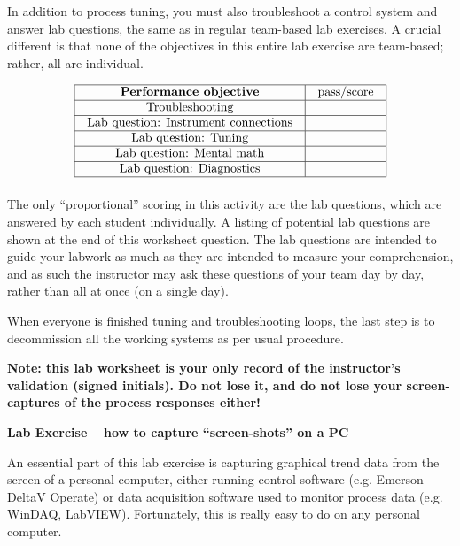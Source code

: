 In addition to process tuning, you must also troubleshoot a control system and answer lab questions, the same as in regular team-based lab exercises.  A crucial different is that none of the objectives in this entire lab exercise are team-based; rather, all are individual. 

\vskip 10pt



$$\vbox{\offinterlineskip
\halign{\strut
\vrule \quad\hfil # \ \hfil & 
\vrule \quad\hfil # \ \hfil \vrule \cr
\noalign{\hrule}
%
{\bf Performance objective} & pass/score \cr
%
\noalign{\hrule}
%
Troubleshooting &   \cr
%
\noalign{\hrule}
%
Lab question: Instrument connections &  \cr
%
\noalign{\hrule}
%
Lab question: Tuning &  \cr
%
\noalign{\hrule}
%
Lab question: Mental math &  \cr
%
\noalign{\hrule}
%
Lab question: Diagnostics &  \cr
%
\noalign{\hrule}
} %
}$$ %

\vskip 10pt

The only ``proportional'' scoring in this activity are the lab questions, which are answered by each student individually.  A listing of potential lab questions are shown at the end of this worksheet question.  The lab questions are intended to guide your labwork as much as they are intended to measure your comprehension, and as such the instructor may ask these questions of your team day by day, rather than all at once (on a single day).

When everyone is finished tuning and troubleshooting loops, the last step is to decommission all the working systems as per usual procedure.

\vskip 10pt

{\bf Note: this lab worksheet is your only record of the instructor's validation (signed initials).  Do not lose it, and do not lose your screen-captures of the process responses either!}





\vfil \eject

\noindent
{\bf Lab Exercise -- how to capture ``screen-shots'' on a PC}

\vskip 5pt

An essential part of this lab exercise is capturing graphical trend data from the screen of a personal computer, either running control software (e.g. Emerson DeltaV Operate) or data acquisition software used to monitor process data (e.g. WinDAQ, LabVIEW).  Fortunately, this is really easy to do on any personal computer. 

